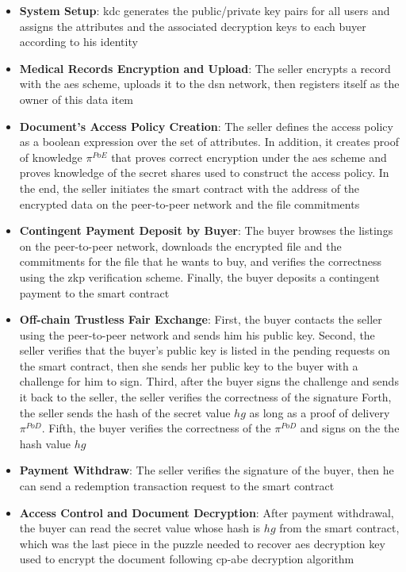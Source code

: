 \begin{itemize}
    \item \textbf{System Setup}: \ac{kdc} generates the public/private key pairs for all users and assigns the attributes and the associated decryption keys to each buyer according to his identity
    \item \textbf{Medical Records Encryption and Upload}:  The seller encrypts a record with the \ac{aes} scheme, uploads it to the \ac{dsn} network, then registers itself as the owner of this data item
    \item \textbf{Document's Access Policy Creation}: The seller defines the access policy as a boolean expression over the set of attributes.
    In addition, it creates proof of knowledge $\pi^{PoE}$ that proves correct encryption under the \ac{aes} scheme and proves knowledge of the secret shares used to construct the access policy.
    In the end, the seller initiates the smart contract with the address of the encrypted data on the peer-to-peer network and the file commitments
    \item \textbf{Contingent Payment Deposit by Buyer}: The buyer browses the listings on the peer-to-peer network, downloads the encrypted file and the commitments for the file that he wants to buy, and verifies the correctness using the \ac{zkp} verification scheme.
    Finally, the buyer deposits a contingent payment to the smart contract
    \item \textbf{Off-chain Trustless Fair Exchange}: First, the buyer contacts the seller using the peer-to-peer network and sends him his public key.
    Second, the seller verifies that the buyer's public key is listed in the pending requests on the smart contract, then she sends her public key to the buyer with a challenge for him to sign.
    Third, after the buyer signs the challenge and sends it back to the seller, the seller verifies the correctness of the signature
    Forth, the seller sends the hash of the secret value $hg$ as long as a proof of delivery $\pi^{PoD}$.
    Fifth, the buyer verifies the correctness of the $\pi^{PoD}$ and signs on the the hash value $hg$
    \item \textbf{Payment Withdraw}: The seller verifies the signature of the buyer, then he can send a redemption transaction request to the smart contract
    \item \textbf{Access Control and Document Decryption}: After payment withdrawal, the buyer can read the secret value whose hash is $hg$ from the smart contract, which was the last piece in the puzzle needed to recover \ac{aes} decryption key used to encrypt the document following \ac{cp-abe} decryption algorithm
    
\end{itemize}